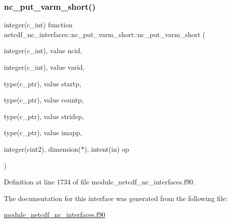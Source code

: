 \subsubsection{\texorpdfstring{nc\+\_\+put\+\_\+varm\+\_\+short()}{nc\_put\_varm\_short()}}
{\footnotesize\ttfamily integer(c\+\_\+int) function netcdf\+\_\+nc\+\_\+interfaces\+::nc\+\_\+put\+\_\+varm\+\_\+short\+::nc\+\_\+put\+\_\+varm\+\_\+short (\begin{DoxyParamCaption}\item[{integer(c\+\_\+int), value}]{ncid,  }\item[{integer(c\+\_\+int), value}]{varid,  }\item[{type(c\+\_\+ptr), value}]{startp,  }\item[{type(c\+\_\+ptr), value}]{countp,  }\item[{type(c\+\_\+ptr), value}]{stridep,  }\item[{type(c\+\_\+ptr), value}]{imapp,  }\item[{integer(cint2), dimension($\ast$), intent(in)}]{op }\end{DoxyParamCaption})}



Definition at line 1734 of file module\+\_\+netcdf\+\_\+nc\+\_\+interfaces.\+f90.



The documentation for this interface was generated from the following file\+:\begin{DoxyCompactItemize}
\item 
\hyperlink{module__netcdf__nc__interfaces_8f90}{module\+\_\+netcdf\+\_\+nc\+\_\+interfaces.\+f90}\end{DoxyCompactItemize}

